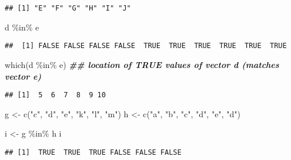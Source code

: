 \documentclass[
]{book}
\newenvironment{Shaded}{\begin{snugshade}}{\end{snugshade}}
\newcommand{\DocumentationTok}[1]{\textcolor[rgb]{0.56,0.35,0.01}{\textbf{\textit{#1}}}}
\newcommand{\FunctionTok}[1]{\textcolor[rgb]{0.00,0.00,0.00}{#1}}
\newcommand{\NormalTok}[1]{#1}
\newcommand{\OtherTok}[1]{\textcolor[rgb]{0.56,0.35,0.01}{#1}}
\newcommand{\SpecialCharTok}[1]{\textcolor[rgb]{0.00,0.00,0.00}{#1}}
\newcommand{\StringTok}[1]{\textcolor[rgb]{0.31,0.60,0.02}{#1}}
\begin{document}
\begin{verbatim}
## [1] "E" "F" "G" "H" "I" "J"
\end{verbatim}

\begin{Shaded}
\begin{Highlighting}[]
\NormalTok{d }\SpecialCharTok{\%in\%}\NormalTok{ e}
\end{Highlighting}
\end{Shaded}

\begin{verbatim}
##  [1] FALSE FALSE FALSE FALSE  TRUE  TRUE  TRUE  TRUE  TRUE  TRUE
\end{verbatim}

\begin{Shaded}
\begin{Highlighting}[]
\FunctionTok{which}\NormalTok{(d }\SpecialCharTok{\%in\%}\NormalTok{ e)   }\DocumentationTok{\#\# location of TRUE values of vector d (matches vector e)}
\end{Highlighting}
\end{Shaded}

\begin{verbatim}
## [1]  5  6  7  8  9 10
\end{verbatim}

\begin{Shaded}
\begin{Highlighting}[]
\NormalTok{g }\OtherTok{\textless{}{-}} \FunctionTok{c}\NormalTok{(}\StringTok{"c"}\NormalTok{, }\StringTok{"d"}\NormalTok{, }\StringTok{"e"}\NormalTok{, }\StringTok{"k"}\NormalTok{, }\StringTok{"l"}\NormalTok{, }\StringTok{"m"}\NormalTok{)}
\NormalTok{h }\OtherTok{\textless{}{-}} \FunctionTok{c}\NormalTok{(}\StringTok{"a"}\NormalTok{, }\StringTok{"b"}\NormalTok{, }\StringTok{"c"}\NormalTok{, }\StringTok{"d"}\NormalTok{, }\StringTok{"e"}\NormalTok{, }\StringTok{"d"}\NormalTok{)}
\end{Highlighting}
\end{Shaded}

\begin{Shaded}
\begin{Highlighting}[]
\NormalTok{i }\OtherTok{\textless{}{-}}\NormalTok{ g }\SpecialCharTok{\%in\%}\NormalTok{ h}
\NormalTok{i}
\end{Highlighting}
\end{Shaded}

\begin{verbatim}
## [1]  TRUE  TRUE  TRUE FALSE FALSE FALSE
\end{verbatim}
\end{document}
